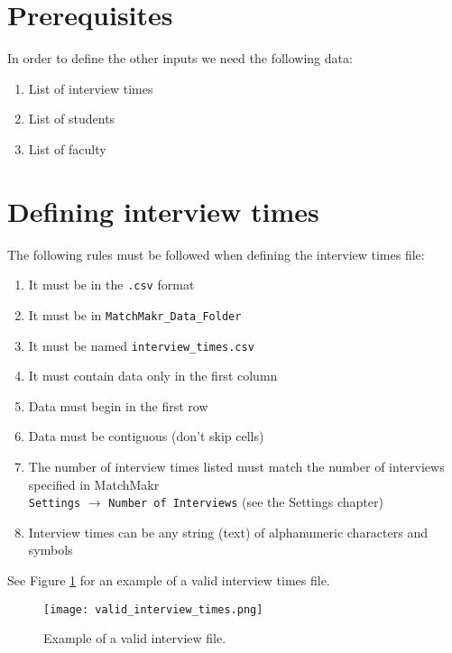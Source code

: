 %
%
\section{Prerequisites}

In order to define the other inputs we need the following data:

\begin{enumerate}
	\item List of interview times
	\item List of students
	\item List of faculty
\end{enumerate}

%
%
\section{Defining interview times}

The following rules must be followed when defining the interview times file:
\begin{enumerate}
	\item It must be in the \texttt{.csv} format
	\item It must be in \texttt{MatchMakr\_Data\_Folder}
	\item It must be named \texttt{interview\_times.csv}
	\item It must contain data only in the first column
	\item Data must begin in the first row
	\item Data must be contiguous (don't skip cells)
	\item The number of interview times listed must match the number of interviews specified in MatchMakr \\
		\texttt{Settings} $\rightarrow$ \texttt{Number of Interviews} (see the Settings chapter)
	\item Interview times can be any string (text) of alphanumeric characters and symbols
\end{enumerate}

See Figure \ref{fig:valid_interview_times} for an example of a valid interview times file.

\begin{figure}
	\centering
	\texttt{[image: valid\_interview\_times.png]}
	\caption{\label{fig:valid_interview_times} Example of a valid interview file.}
\end{figure}



